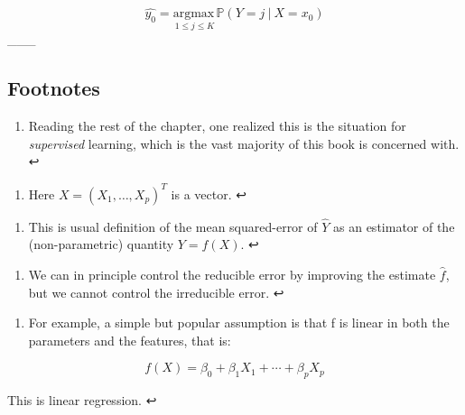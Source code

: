 \documentclass[11pt]{article}
\providecommand{\tightlist}{%
      \setlength{\itemsep}{0pt}\setlength{\parskip}{0pt}}
\begin{document}
\[ \hat{y_0} = \underset{1\leqslant j \leqslant K}{\text{argmax}\,} \mathbb{P}\left(Y=j\ |\ X = x_0\right)\]
\_\_\_

    \hypertarget{footnotes}{%
\subsection{Footnotes}\label{footnotes}}

    \hypertarget{foot0}{}
\begin{enumerate}
\def\labelenumi{\arabic{enumi}.}
\setcounter{enumi}{-1}
\tightlist
\item
  Reading the rest of the chapter, one realized this is the situation
  for \emph{supervised} learning, which is the vast majority of this
  book is concerned with. ↩
\end{enumerate}

\hypertarget{foot1}{}
\begin{enumerate}
\def\labelenumi{\arabic{enumi}.}
\tightlist
\item
  Here \(X=(X_1,\dots, X_p)^T\) is a vector. ↩
\end{enumerate}

\hypertarget{foot2}{}
\begin{enumerate}
\def\labelenumi{\arabic{enumi}.}
\setcounter{enumi}{1}
\tightlist
\item
  This is usual definition of the mean squared-error of \(\hat{Y}\) as
  an estimator of the (non-parametric) quantity \(Y=f(X)\). ↩
\end{enumerate}

\hypertarget{foot3}{}
\begin{enumerate}
\def\labelenumi{\arabic{enumi}.}
\setcounter{enumi}{2}
\tightlist
\item
  We can in principle control the reducible error by improving the
  estimate \(\hat{f}\), but we cannot control the irreducible error. ↩
\end{enumerate}

\hypertarget{foot4}{}
\begin{enumerate}
\def\labelenumi{\arabic{enumi}.}
\setcounter{enumi}{3}
\tightlist
\item
  For example, a simple but popular assumption is that f is linear in
  both the parameters and the features, that is:
\end{enumerate}

\[f(X) = \beta_0 + \beta_1 X_1 + \cdots + \beta_p X_p\]

This is linear regression. ↩
\end{document}
